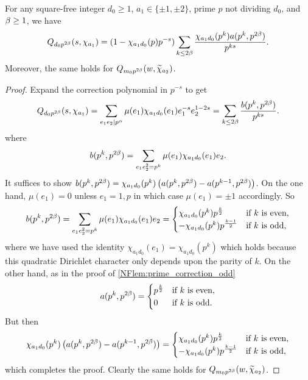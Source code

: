     \begin{lemma}\label{NFlem:prime_correction_even}
        For any square-free integer $d_{0} \ge 1$, $a_{1} \in \{\pm1,\pm2\}$, prime $p$ not dividing $d_{0}$, and $\beta \ge 1$, we have
        \[
            Q_{d_{0}p^{2\beta}}(s,\chi_{a_{1}}) = (1-\chi_{a_{1}d_{0}}(p)p^{-s})\sum_{k \le 2\beta}\frac{\chi_{a_{1}d_{0}}(p^{k})a(p^{k},p^{2\beta})}{p^{ks}}.
        \]
        Moreover, the same holds for $Q_{m_{0}p^{2\beta}}(w,\widetilde{\chi}_{a_{2}})$.
    \end{lemma}
    \begin{proof}
        Expand the correction polynomial in $p^{-s}$ to get
        \[
            Q_{d_{0}p^{2\beta}}(s,\chi_{a_{1}}) = \sum_{e_{1}e_{2} \mid p^{\alpha}}\mu(e_{1})\chi_{a_{1}d_{0}}(e_{1})e_{1}^{-s}e_{2}^{1-2s} = \sum_{k \le 2\beta}\frac{b(p^{k},p^{2\beta})}{p^{ks}}.
        \]
        where
        \[
            b(p^{k},p^{2\beta}) = \sum_{e_{1}e_{2}^{2} = p^{k}}\mu(e_{1})\chi_{a_{1}d_{0}}(e_{1})e_{2}.
        \]
        It suffices to show $b(p^{k},p^{2\beta}) = \chi_{a_{1}d_{0}}(p^{k})\left(a(p^{k},p^{2\beta})-a(p^{k-1},p^{2\beta})\right)$. On the one hand, $\mu(e_{1}) = 0$ unless $e_{1} = 1,p$ in which case $\mu(e_{1}) = \pm1$ accordingly. So
        \[
            b(p^{k},p^{2\beta}) = \sum_{e_{1}e_{2}^{2} = p^{k}}\mu(e_{1})\chi_{a_{1}d_{0}}(e_{1})e_{2} = \begin{cases} \chi_{a_{1}d_{0}}(p^{k})p^{\frac{k}{2}} & \text{if $k$ is even}, \\ -\chi_{a_{1}d_{0}}(p^{k})p^{\frac{k-1}{2}} & \text{if $k$ is odd}, \end{cases}
        \]
        where we have used the identity $\chi_{a_{1}d_{0}}(e_{1}) = \chi_{a_{1}d_{0}}(p^{k})$ which holds because this quadratic Dirichlet character only depends upon the parity of $k$. On the other hand, as in the proof of \cref{NFlem:prime_correction_odd} 
        \[
            a(p^{k},p^{2\beta}) = \begin{cases} p^{\frac{k}{2}} & \text{if $k$ is even}, \\ 0 & \text{if $k$ is odd}. \end{cases}
        \]
        But then
        \[
            \chi_{a_{1}d_{0}}(p^{k})\left(a(p^{k},p^{2\beta})-a(p^{k-1},p^{2\beta})\right) = \begin{cases} \chi_{a_{1}d_{0}}(p^{k})p^{\frac{k}{2}} & \text{if $k$ is even}, \\ -\chi_{a_{1}d_{0}}(p^{k})p^{\frac{k-1}{2}} & \text{if $k$ is odd}, \end{cases}
        \]
        which completes the proof. Clearly the same holds for $Q_{m_{0}p^{2\beta}}(w,\widetilde{\chi}_{a_{2}})$.
    \end{proof}

